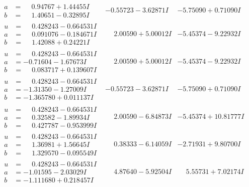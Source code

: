 \documentclass[1p]{elsarticle_modified}
\theoremstyle{definition}
\begin{document}
$$\begin{array}{c|c|c}
\begin{aligned}
a &= \phantom{-}0.94767 + 1.44455 I \\
b &= \phantom{-}1.40651 - 0.32895 I\end{aligned}
 & -0.55723 - 3.62871 I & -5.75090 + 0.71090 I \\ \hline\begin{aligned}
u &= \phantom{-}0.428243 - 0.664531 I \\
a &= \phantom{-}0.091076 - 0.184671 I \\
b &= \phantom{-}1.42088 + 0.24221 I\end{aligned}
 & \phantom{-}2.00590 + 5.00012 I & -5.45374 - 9.22932 I \\ \hline\begin{aligned}
u &= \phantom{-}0.428243 - 0.664531 I \\
a &= -0.71604 - 1.67673 I \\
b &= \phantom{-}0.083717 + 0.139607 I\end{aligned}
 & \phantom{-}2.00590 + 5.00012 I & -5.45374 - 9.22932 I \\ \hline\begin{aligned}
u &= \phantom{-}0.428243 - 0.664531 I \\
a &= -1.31350 - 1.27009 I \\
b &= -1.365780 + 0.011137 I\end{aligned}
 & -0.55723 - 3.62871 I & -5.75090 + 0.71090 I \\ \hline\begin{aligned}
u &= \phantom{-}0.428243 - 0.664531 I \\
a &= \phantom{-}0.32582 - 1.89934 I \\
b &= \phantom{-}0.427787 - 0.953999 I\end{aligned}
 & \phantom{-}2.00590 - 6.84873 I & -5.45374 + 10.81777 I \\ \hline\begin{aligned}
u &= \phantom{-}0.428243 - 0.664531 I \\
a &= \phantom{-}1.36981 + 1.56645 I \\
b &= \phantom{-}1.329570 - 0.095549 I\end{aligned}
 & \phantom{-}0.38333 - 6.14059 I & -2.71931 + 9.80700 I \\ \hline\begin{aligned}
u &= \phantom{-}0.428243 - 0.664531 I \\
a &= -1.01595 - 2.03029 I \\
b &= -1.111680 + 0.218457 I\end{aligned}
 & \phantom{-}4.87640 - 5.92504 I & \phantom{-}5.55731 + 7.02174 I \\ \hline\begin{aligned}

\end{aligned}
\end{array}$$
\end{document}
